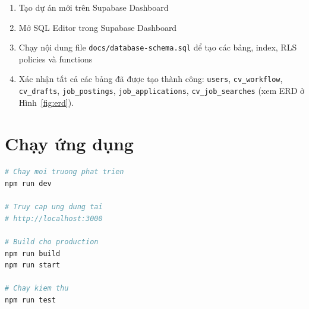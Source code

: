 \documentclass[../DoAn.tex]{subfiles}
\begin{document}
\begin{enumerate}
\item Tạo dự án mới trên Supabase Dashboard
\item Mở SQL Editor trong Supabase Dashboard
\item Chạy nội dung file \texttt{docs/database-schema.sql} để tạo các bảng, index, RLS policies và functions
\item Xác nhận tất cả các bảng đã được tạo thành công: \texttt{users}, \texttt{cv\_workflow}, \texttt{cv\_drafts}, \texttt{job\_postings}, \texttt{job\_applications}, \texttt{cv\_job\_searches} (xem ERD ở Hình~\ref{fig:erd}).
\end{enumerate}

\section{Chạy ứng dụng}

\begin{lstlisting}[language=bash, caption={Khởi động ứng dụng}]
# Chay moi truong phat trien
npm run dev

# Truy cap ung dung tai
# http://localhost:3000

# Build cho production
npm run build
npm run start

# Chay kiem thu
npm run test
\end{lstlisting}
\end{document}
